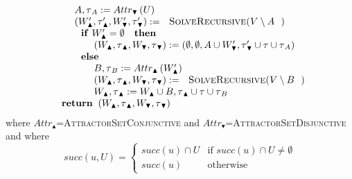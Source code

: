 \begin{equation*}
\begin{array}{l}
\qquad A,\tau _{A}:=Attr_{\blacktriangledown }\left( U\right)  \\ 
\qquad \left( W_{\blacktriangle }^{\prime },\tau _{\blacktriangle }^{\prime
},W_{\blacktriangledown }^{\prime },\tau _{\blacktriangledown }^{\prime
}\right) :=\text{\textsc{SolveRecursive(}}V\setminus A\text{)} \\ 
\qquad \text{\textbf{if} }W_{\blacktriangle }^{\prime }=\emptyset \text{ 
\textbf{then}} \\ 
\qquad \qquad \left( W_{\blacktriangle },\tau _{\blacktriangle
},W_{\blacktriangledown },\tau _{\blacktriangledown }\right) :=\left(
\emptyset ,\emptyset ,A\cup W_{\blacktriangledown }^{\prime },\tau
_{\blacktriangledown }^{\prime }\cup \tau \cup \tau _{A}\right)  \\ 
\qquad \text{\textbf{else}} \\ 
\qquad \qquad B,\tau _{B}:=Attr_{\blacktriangle }\left( W_{\blacktriangle
}^{\prime }\right)  \\ 
\qquad \qquad \left( W_{\blacktriangle },\tau _{\blacktriangle
},W_{\blacktriangledown },\tau _{\blacktriangledown }\right) :=\text{\textsc{%
SolveRecursive(}}V\setminus B\text{)} \\ 
\qquad \qquad W_{\blacktriangle },\tau _{\blacktriangle }:=W_{\blacktriangle
}\cup B,\tau _{\blacktriangle }\cup \tau \cup \tau _{B} \\ 
\text{\textbf{return }}\left( W_{\blacktriangle },\tau _{\blacktriangle
},W_{\blacktriangledown },\tau _{\blacktriangledown }\right) 
\end{array}%
\end{equation*}%
where $Attr_{\blacktriangle }$=\textsc{AttractorSetConjunctive} and $%
Attr_{\blacktriangledown }$=\textsc{AttractorSetDisjunctive} and where%
\begin{equation*}
succ(u,U)=\left\{ 
\begin{array}{ll}
succ(u)\cap U & \text{if }succ(u)\cap U\neq \emptyset  \\ 
succ(u) & \text{otherwise}%
\end{array}%
\right. 
\end{equation*}


